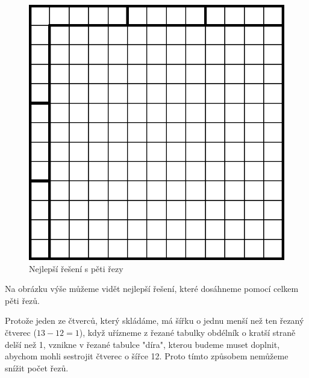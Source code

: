 \documentclass{fkssolpub}
\author{Ondřej Sedláček}
\begin{document}
 

\begin{figure}[h!]
  \centering
  \includegraphics{7-fig}
  \caption{Nejlepší řešení s pěti řezy}
\end{figure}

Na obrázku výše můžeme vidět nejlepší řešení, které dosáhneme pomocí celkem
pěti řezů.

Protože jeden ze čtverců, který skládáme, má šířku o jednu menší než ten řezaný čtverec
($13 - 12 = 1$), když uřízneme z řezané tabulky obdélník o kratší straně delší než 1,
vznikne v řezané tabulce "díra", kterou budeme muset doplnit, abychom mohli sestrojit
čtverec o šířce 12. Proto tímto způsobem nemůžeme snížit počet řezů.
\end{document}
